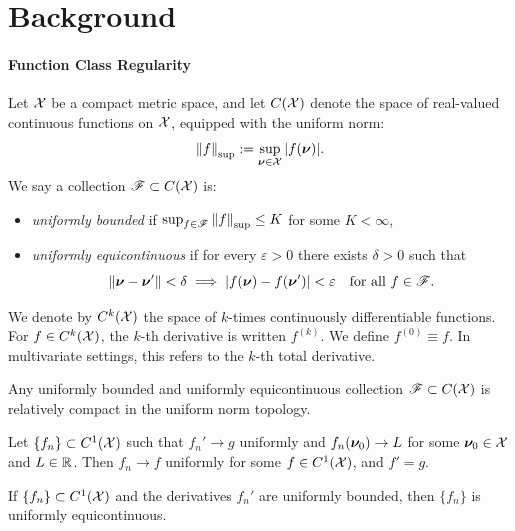\section{Background}\label{app:background}

\paragraph{Function Class Regularity} 
Let \( \mathcal{X} \) be a compact metric space, and let \( C(\mathcal{X}) \) denote the space of real-valued continuous functions on \( \mathcal{X} \), equipped with the uniform norm:
\[
    \norm{f}_{\mathrm{sup}} := \sup_{\bm{\nu} \in \mathcal{X}} |f(\bm{\nu})|.
\]
We say a collection \( \mathscr{F} \subset C(\mathcal{X}) \) is:
\begin{itemize}
    \item \emph{uniformly bounded} if \( \sup_{f \in \mathscr{F}} \norm{f}_{\mathrm{sup}} \leq K \) for some \( K < \infty \),
    \item \emph{uniformly equicontinuous} if for every \( \varepsilon > 0 \) there exists \( \delta > 0 \) such that
    \[
        \norm{\bm{\nu} - \bm{\nu}'} < \delta \implies |f(\bm{\nu}) - f(\bm{\nu}')| < \varepsilon \quad \text{for all } f \in \mathscr{F}.
    \]
\end{itemize}

We denote by \( C^k(\mathcal{X}) \) the space of \( k \)-times continuously differentiable functions. For \( f \in C^k(\mathcal{X}) \), the \( k \)-th derivative is written \( f^{(k)} \). We define $f^{(0)} \equiv f$. In multivariate settings, this refers to the \( k \)-th total derivative.

\begin{theorem}\label{thm:arzela-ascoli}
Any uniformly bounded and uniformly equicontinuous collection \( \mathscr{F} \subset C(\mathcal{X}) \) is relatively compact in the uniform norm topology.
\end{theorem}

\begin{proposition}\label{prop:derivative_uniform_convergence}
Let \( \{f_n\} \subset C^1(\mathcal{X}) \) such that \( f_n' \to g \) uniformly and \( f_n(\bm{\nu}_0) \to L \) for some \( \bm{\nu}_0 \in \mathcal{X} \) and $L \in \mathbb{R}$. Then \( f_n \to f \) uniformly for some \( f \in C^1(\mathcal{X}) \), and \( f' = g \).
\end{proposition}

\begin{proposition}\label{prop:equi_deriv_bound}
If \( \{f_n\} \subset C^1(\mathcal{X}) \) and the derivatives \( f_n' \) are uniformly bounded, then \( \{f_n\} \) is uniformly equicontinuous.
\end{proposition}

